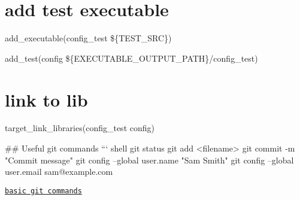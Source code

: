 \section*{add test executable}

add\+\_\+executable(config\+\_\+test \$\{T\+E\+S\+T\+\_\+\+S\+RC\})

add\+\_\+test(config \$\{E\+X\+E\+C\+U\+T\+A\+B\+L\+E\+\_\+\+O\+U\+T\+P\+U\+T\+\_\+\+P\+A\+TH\}/config\+\_\+test)

\section*{link to lib}

target\+\_\+link\+\_\+libraries(config\+\_\+test config) 
\begin{DoxyCode}
## Useful git commands
``` shell
git status
git add <filename>
git commit -m "Commit message"
git config --global user.name "Sam Smith"
git config --global user.email sam@example.com
\end{DoxyCode}

\begin{DoxyItemize}
\item \href{https://confluence.atlassian.com/bitbucketserver/basic-git-commands-776639767.html}{\tt basic git commands} 
\end{DoxyItemize}
